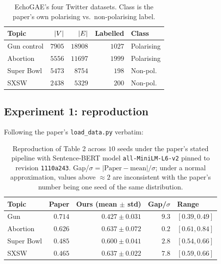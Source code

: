 \documentclass[letterpaper]{article} %
\begin{document}
\begin{table}[t]
\centering
\small
\begin{tabular}{lrrrl}
\toprule
Topic & $|V|$ & $|E|$ & Labelled & Class \\
\midrule
Gun control  & $7905$ & $18908$ & $1027$ & Polarising \\
Abortion     & $5556$ & $11697$ & $1999$ & Polarising \\
Super Bowl   & $5473$ & $8754$  & $198$  & Non-pol. \\
SXSW         & $2438$ & $5329$  & $200$  & Non-pol. \\
\bottomrule
\end{tabular}
\caption{EchoGAE's four Twitter datasets. Class is the paper's own
polarising vs.~non-polarising label.}\label{tab:datasets}
\end{table}

\subsection{Experiment 1: reproduction}\label{sec:exp-repro}

Following the paper's \texttt{load\_data.py} verbatim:

\begin{table}[t]
\centering
\small
\setlength{\tabcolsep}{4pt}
\begin{tabular}{lrrrl}
\toprule
Topic & Paper & Ours (mean $\pm$ std) & Gap/$\sigma$ & Range \\
\midrule
Gun        & $0.714$ & $0.427 \pm 0.031$ & $9.3$ & $[0.39, 0.49]$ \\
Abortion   & $0.626$ & $0.637 \pm 0.072$ & $0.2$ & $[0.61, 0.84]$ \\
Super Bowl & $0.485$ & $0.600 \pm 0.041$ & $2.8$ & $[0.54, 0.66]$ \\
SXSW       & $0.465$ & $0.637 \pm 0.022$ & $7.8$ & $[0.59, 0.66]$ \\
\bottomrule
\end{tabular}
\caption{Reproduction of \citet{Alatawi23EchoGAE} Table 2 across
$10$ seeds under the paper's stated pipeline with Sentence-BERT
model \texttt{all-MiniLM-L6-v2} pinned to revision
\texttt{1110a243}. Gap/$\sigma = |\text{Paper} - \text{mean}| /
\sigma$; under a normal approximation, values above $\approx 2$
are inconsistent with the paper's number being one seed of the
same distribution.}\label{tab:repro}
\end{table}
\end{document}
